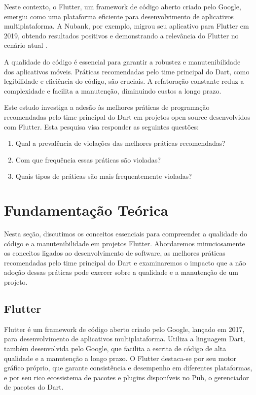 \documentclass[12pt]{article}
\begin{document}
Neste contexto, o Flutter, um framework de código aberto criado pelo Google, emergiu como uma plataforma eficiente para desenvolvimento de aplicativos multiplataforma. A Nubank, por exemplo, migrou seu aplicativo para Flutter em 2019, obtendo resultados positivos e demonstrando a relevância do Flutter no cenário atual \cite{Nubank2023}.

A qualidade do código é essencial para garantir a robustez e manutenibilidade dos aplicativos móveis. Práticas recomendadas pelo time principal do Dart, como legibilidade e eficiência do código, são cruciais. A refatoração constante reduz a complexidade e facilita a manutenção, diminuindo custos a longo prazo.

Este estudo investiga a adesão às melhores práticas de programação recomendadas pelo time principal do Dart em projetos open source desenvolvidos com Flutter. Esta pesquisa visa responder as seguintes questões:
\begin{enumerate}
    \item Qual a prevalência de violações das melhores práticas recomendadas?
    \item Com que frequência essas práticas são violadas?
    \item Quais tipos de práticas são mais frequentemente violadas?
\end{enumerate}

\section{Fundamentação Teórica}
Nesta seção, discutimos os conceitos essenciais para compreender a qualidade do código e a manutenibilidade em projetos Flutter. Abordaremos minuciosamente os conceitos ligados ao desenvolvimento de software, as melhores práticas recomendadas pelo time principal do Dart e examinaremos o impacto que a não adoção dessas práticas pode exercer sobre a qualidade e a manutenção de um projeto.

\subsection{Flutter}
Flutter é um framework de código aberto criado pelo Google, lançado em 2017, para desenvolvimento de aplicativos multiplataforma. Utiliza a linguagem Dart, também desenvolvida pelo Google, que facilita a escrita de código de alta qualidade e a manutenção a longo prazo. O Flutter destaca-se por seu motor gráfico próprio, que garante consistência e desempenho em diferentes plataformas, e por seu rico ecossistema de pacotes e plugins disponíveis no Pub, o gerenciador de pacotes do Dart.
\end{document}
